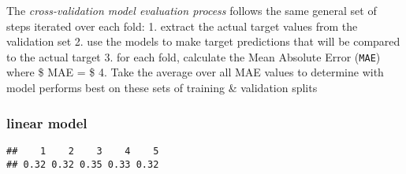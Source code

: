\documentclass[]{article}
\newenvironment{Shaded}{\begin{snugshade}}{\end{snugshade}}
\newcommand{\KeywordTok}[1]{\textcolor[rgb]{0.13,0.29,0.53}{\textbf{#1}}}
\newcommand{\DataTypeTok}[1]{\textcolor[rgb]{0.13,0.29,0.53}{#1}}
\newcommand{\StringTok}[1]{\textcolor[rgb]{0.31,0.60,0.02}{#1}}
\newcommand{\CommentTok}[1]{\textcolor[rgb]{0.56,0.35,0.01}{\textit{#1}}}
\newcommand{\OperatorTok}[1]{\textcolor[rgb]{0.81,0.36,0.00}{\textbf{#1}}}
\newcommand{\NormalTok}[1]{#1}
\begin{document}
The \emph{cross-validation model evaluation process} follows the same
general set of steps iterated over each fold: 1. extract the actual
target values from the validation set 2. use the models to make target
predictions that will be compared to the actual target 3. for each fold,
calculate the Mean Absolute Error (\texttt{MAE}) where \$ MAE =
 \$ 4. Take the average
over all MAE values to determine with model performs best on these sets
of training \& validation splits

\subsubsection{linear model}\label{linear-model-1}

\begin{Shaded}
\end{Shaded}

\begin{verbatim}
##    1    2    3    4    5 
## 0.32 0.32 0.35 0.33 0.32
\end{verbatim}
\end{document}
